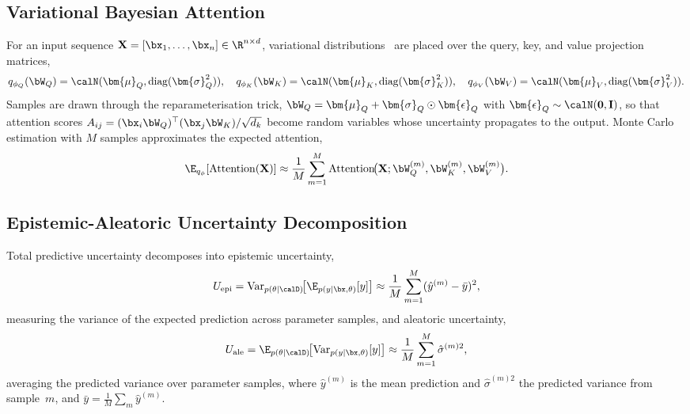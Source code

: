 \subsection{Variational Bayesian Attention}

For an input sequence $\mathbf{X}=[\bx_1,\dots,\bx_n]\in\R^{n\times d}$, variational distributions~\cite{Blundell2015} are placed over the query, key, and value projection matrices,
\begin{equation}
q_{\phi_Q}(\bW_Q) = \calN(\bm{\mu}_Q,\mathrm{diag}(\bm{\sigma}_Q^2)),
\quad
q_{\phi_K}(\bW_K) = \calN(\bm{\mu}_K,\mathrm{diag}(\bm{\sigma}_K^2)),
\quad
q_{\phi_V}(\bW_V) = \calN(\bm{\mu}_V,\mathrm{diag}(\bm{\sigma}_V^2)).
\label{eq:stoch_var_attn}
\end{equation}
Samples are drawn through the reparameterisation trick, $\bW_Q=\bm{\mu}_Q+\bm{\sigma}_Q\odot\bm{\epsilon}_Q$ with $\bm{\epsilon}_Q\sim\calN(\mathbf{0},\mathbf{I})$, so that attention scores $A_{ij}=(\bx_i\bW_Q)^\top(\bx_j\bW_K)/\sqrt{d_k}$ become random variables whose uncertainty propagates to the output. Monte Carlo estimation with $M$ samples approximates the expected attention,
\begin{equation}
\E_{q_\phi}[\mathrm{Attention}(\mathbf{X})]
\approx \frac{1}{M}\sum_{m=1}^{M}
  \mathrm{Attention}\!\bigl(\mathbf{X};\bW_Q^{(m)},\bW_K^{(m)},\bW_V^{(m)}\bigr).
\label{eq:stoch_mc_attn}
\end{equation}

\subsection{Epistemic-Aleatoric Uncertainty Decomposition}

Total predictive uncertainty decomposes into epistemic uncertainty,
\begin{equation}
U_{\mathrm{epi}}
= \mathrm{Var}_{p(\theta|\calD)}\!\bigl[\E_{p(y|\bx,\theta)}[y]\bigr]
\approx \frac{1}{M}\sum_{m=1}^{M}(\hat{y}^{(m)}-\bar{y})^2,
\label{eq:stoch_epi}
\end{equation}
measuring the variance of the expected prediction across parameter samples, and aleatoric uncertainty,
\begin{equation}
U_{\mathrm{ale}}
= \E_{p(\theta|\calD)}\!\bigl[\mathrm{Var}_{p(y|\bx,\theta)}[y]\bigr]
\approx \frac{1}{M}\sum_{m=1}^{M}\hat{\sigma}^{(m)2},
\label{eq:stoch_ale}
\end{equation}
averaging the predicted variance over parameter samples, where $\hat{y}^{(m)}$ is the mean prediction and $\hat{\sigma}^{(m)2}$ the predicted variance from sample~$m$, and $\bar{y}=\frac{1}{M}\sum_m\hat{y}^{(m)}$.

